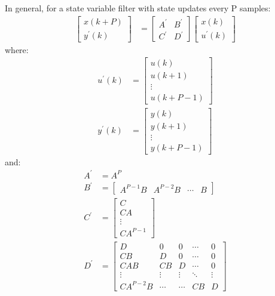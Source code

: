 \documentclass[a4paper,twoside,10pt,english]{report}
\begin{document}
In general, for a state variable filter with state updates every P samples:
\begin{align*}
\left[ \begin{array}{c} 
x \left( k + P \right) \\
y^{\prime} \left(k\right)
\end{array} \right]
 &= 
\left[ \begin{array}{cc}
A^{\prime} & B^{\prime}\\ 
C^{\prime} & D^{\prime}
\end{array}\right]
\left[ \begin{array}{c}
x \left( k \right)\\
u^{\prime} \left( k \right)
\end{array}\right]
\end{align*}
where:
\begin{align*}
u^{\prime} \left( k \right) &= \left[ 
\begin{array}{c}
u\left(k\right)\\
u\left(k+1\right)\\
\vdots\\
u\left(k+P-1\right)
\end{array} \right]\\
y^{\prime} \left(k\right) &= \left[ 
\begin{array}{c}
y\left(k\right)\\
y\left(k+1\right)\\
\vdots\\
y\left(k+P-1\right)
\end{array}\right]
\end{align*}
and:
\begin{align*}
A^{\prime} &= A^{P}\\ 
B^{\prime} &= \left[
\begin{array}{cccc}
A^{P-1}B & A^{P-2}B & \cdots & B
\end{array}\right]\\
C^{\prime} &= \left[
\begin{array}{c}
C\\
CA\\
\vdots\\
CA^{P-1}
\end{array}\right]\\
D^{\prime} &= \left[
\begin{array}{ccccc}
D & 0 & 0 & \cdots & 0\\
CB & D & 0 & \cdots & 0\\
CAB & CB & D & \cdots & 0\\
\vdots & \vdots & \vdots & \ddots & \vdots\\
CA^{P-2}B & \cdots & \cdots & CB & D
\end{array}\right]
\end{align*}
\end{document}

